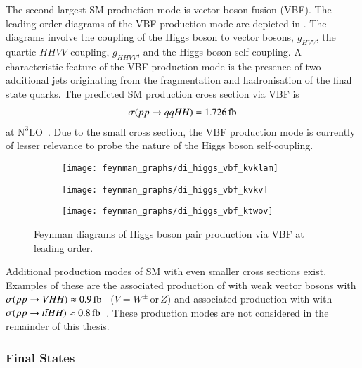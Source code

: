 The second largest SM \HH production mode is vector boson fusion (VBF). The
leading order diagrams of the VBF production mode are depicted in
. The diagrams involve the coupling of the Higgs
boson to vector bosons, $g_{HVV}$, the quartic $HHVV$ coupling, $g_{HHVV}$, and
the Higgs boson self-coupling. A characteristic feature of the VBF production
mode is the presence of two additional jets originating from the fragmentation
and hadronisation of the final state quarks. The predicted SM \HH production
cross section via VBF is
\begin{align*}
  \sigma(\pp \to qqHH) = \SI{1.726}{\femto\barn}
\end{align*}
at $\text{N}^3\text{LO}$~\cite{Dreyer:2018qbw,LHCHWGHH}. Due to the small cross
section, the VBF production mode is currently of lesser relevance to probe the
nature of the Higgs boson self-coupling.

\begin{figure}[htbp]
  \centering

  \begin{subfigure}{0.33\textwidth}
    \centering
    \texttt{[image: feynman\_graphs/di\_higgs\_vbf\_kvklam]}
    \subcaption{}
  \end{subfigure}\hfill%
  \begin{subfigure}{0.33\textwidth}
    \centering
    \texttt{[image: feynman\_graphs/di\_higgs\_vbf\_kvkv]}
    \subcaption{}
  \end{subfigure}\hfill%
  \begin{subfigure}{0.33\textwidth}
    \centering
    \texttt{[image: feynman\_graphs/di\_higgs\_vbf\_ktwov]}
    \subcaption{}
  \end{subfigure}

  \caption{Feynman diagrams of Higgs boson pair production via VBF at leading
    order.}%
  \label{fig:dihiggs_vbf_feyn}
\end{figure}

Additional production modes of SM \HH with even smaller cross sections
exist. Examples of these are the associated production of \HH with weak vector
bosons with
$\sigma(\pp \to VHH) \approx \SI{0.9}{\femto\barn}$~\cite{deFlorian:2016spz}
($V = W^\pm\,\text{or}\,Z$) and associated production with \ttbar with
$\sigma(\pp \to \ttbar HH) \approx
\SI{0.8}{\femto\barn}$~\cite{deFlorian:2016spz}. These production modes are not
considered in the remainder of this thesis.


\subsubsection{Final States}%

